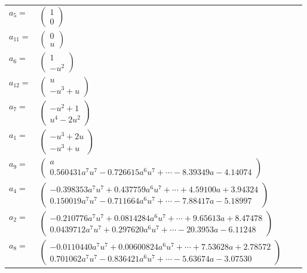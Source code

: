 \documentclass[1p]{elsarticle_modified}
\theoremstyle{definition}
\begin{document}
\begin{tabular}{m{7pt} m{180pt} m{7pt} m{180pt} }
\flushright $a_{5}=$&$\begin{pmatrix}1\\0\end{pmatrix}$ \\
\flushright $a_{11}=$&$\begin{pmatrix}0\\u\end{pmatrix}$ \\
\flushright $a_{6}=$&$\begin{pmatrix}1\\- u^2\end{pmatrix}$ \\
\flushright $a_{12}=$&$\begin{pmatrix}u\\- u^3+u\end{pmatrix}$ \\
\flushright $a_{7}=$&$\begin{pmatrix}- u^2+1\\u^4-2 u^2\end{pmatrix}$ \\
\flushright $a_{1}=$&$\begin{pmatrix}- u^3+2 u\\- u^3+u\end{pmatrix}$ \\
\flushright $a_{9}=$&$\begin{pmatrix}a\\0.560431 a^{7} u^{7}-0.726615 a^{6} u^{7}+\cdots-8.39349 a-4.14074\end{pmatrix}$ \\
\flushright $a_{4}=$&$\begin{pmatrix}-0.398353 a^{7} u^{7}+0.437759 a^{6} u^{7}+\cdots+4.59100 a+3.94324\\0.150019 a^{7} u^{7}-0.711664 a^{6} u^{7}+\cdots-7.88417 a-5.18997\end{pmatrix}$ \\
\flushright $a_{2}=$&$\begin{pmatrix}-0.210776 a^{7} u^{7}+0.0814284 a^{6} u^{7}+\cdots+9.65613 a+8.47478\\0.0439712 a^{7} u^{7}+0.297620 a^{6} u^{7}+\cdots-20.3953 a-6.11248\end{pmatrix}$ \\
\flushright $a_{8}=$&$\begin{pmatrix}-0.0110440 a^{7} u^{7}+0.00600824 a^{6} u^{7}+\cdots+7.53628 a+2.78572\\0.701062 a^{7} u^{7}-0.836421 a^{6} u^{7}+\cdots-5.63674 a-3.07530\end{pmatrix}$ \\

\end{tabular}
\end{document}
